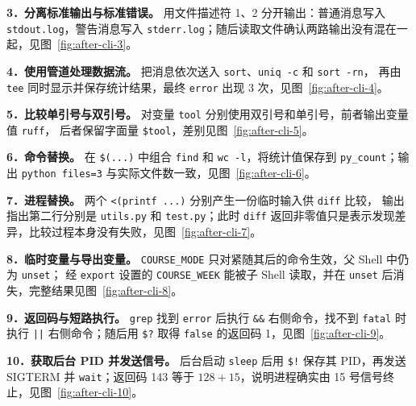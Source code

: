 \documentclass[12pt,a4paper,fontset=fandol]{ctexart}
\begin{document}
\noindent\textbf{3．分离标准输出与标准错误。}
用文件描述符 1、2 分开输出：普通消息写入 \texttt{stdout.log}，警告消息写入
\texttt{stderr.log}；随后读取文件确认两路输出没有混在一起，见图~\ref{fig:after-cli-3}。

\noindent\textbf{4．使用管道处理数据流。}
把消息依次送入 \texttt{sort}、\texttt{uniq -c} 和 \texttt{sort -rn}，
再由 \texttt{tee} 同时显示并保存统计结果，最终 \texttt{error} 出现 3 次，见图~\ref{fig:after-cli-4}。

\noindent\textbf{5．比较单引号与双引号。}
对变量 \texttt{tool} 分别使用双引号和单引号，前者输出变量值 \texttt{ruff}，
后者保留字面量 \texttt{\$tool}，差别见图~\ref{fig:after-cli-5}。

\noindent\textbf{6．命令替换。}
在 \texttt{\$(...)} 中组合 \texttt{find} 和 \texttt{wc -l}，将统计值保存到
\texttt{py\_count}；输出 \texttt{python files=3} 与实际文件数一致，见图~\ref{fig:after-cli-6}。

\noindent\textbf{7．进程替换。}
两个 \texttt{<(printf ...)} 分别产生一份临时输入供 \texttt{diff} 比较，
输出指出第二行分别是 \texttt{utils.py} 和 \texttt{test.py}；此时 \texttt{diff}
返回非零值只是表示发现差异，比较过程本身没有失败，见图~\ref{fig:after-cli-7}。

\noindent\textbf{8．临时变量与导出变量。}
\texttt{COURSE\_MODE} 只对紧随其后的命令生效，父 Shell 中仍为 \texttt{unset}；
经 \texttt{export} 设置的 \texttt{COURSE\_WEEK} 能被子 Shell 读取，并在
\texttt{unset} 后消失，完整结果见图~\ref{fig:after-cli-8}。

\noindent\textbf{9．返回码与短路执行。}
\texttt{grep} 找到 \texttt{error} 后执行 \texttt{\&\&} 右侧命令，找不到
\texttt{fatal} 时执行 \texttt{||} 右侧命令；随后用 \texttt{\$?} 取得
\texttt{false} 的返回码 1，见图~\ref{fig:after-cli-9}。

\noindent\textbf{10．获取后台 PID 并发送信号。}
后台启动 \texttt{sleep} 后用 \texttt{\$!} 保存其 PID，再发送 SIGTERM 并
\texttt{wait}；返回码 143 等于 \(128+15\)，说明进程确实由 15 号信号终止，见图~\ref{fig:after-cli-10}。
\end{document}
